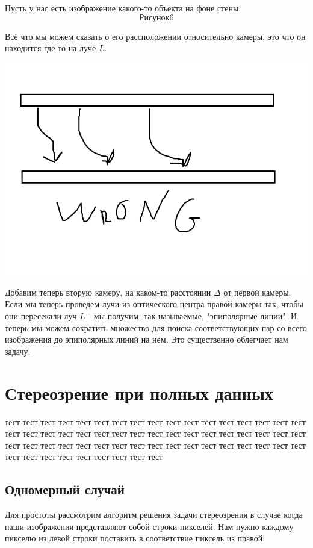 	Пусть у нас есть изображение какого-то объекта на фоне стены.
	$$Рисунок 6$$
	
	Всё что мы можем сказать о его рассположении относительно камеры, это что он находится где-то на луче $L$.
	
	\includegraphics[scale = 0.75]{epipolar}
	
	Добавим теперь вторую камеру, на каком-то расстоянии $\Delta$ от первой камеры. Если мы теперь проведем лучи из оптического центра правой камеры так, чтобы они пересекали луч $L$ - мы получим, так называемые, "эпиполярные линии". И теперь мы можем сократить множество для поиска соответствующих пар со всего изображения до эпиполярных линий на нём. Это существенно облегчает нам задачу.
	
	
\section{Стереозрение при полных данных}
	тест тест тест тест тест тест тест тест тест тест тест тест тест тест тест тест тест тест тест тест тест тест тест тест тест тест тест тест тест тест тест тест тест тест тест тест тест тест тест тест тест тест тест тест тест тест тест тест тест тест тест тест тест тест тест тест тест тест тест тест 
	
	\subsection{Одномерный случай}
	Для простоты рассмотрим алгоритм решения задачи стереозрения в случае когда наши изображения представляют собой строки пикселей. 
	Нам нужно каждому пикселю из левой строки поставить в соответствие пиксель из правой:
	
